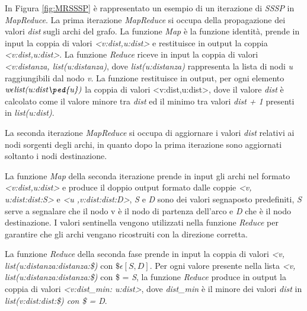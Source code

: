 \documentclass[LaM,binding=0.6cm]{sapthesis}
\begin{document}
In Figura \ref{fig:MRSSSP} è rappresentato un esempio di un iterazione di \textit{SSSP} in \textit{MapReduce}.
La prima iterazione \textit{MapReduce} si occupa della propagazione dei valori \textit{dist} sugli archi del grafo.
La funzione \textit{Map} è la funzione identità, prende in input la coppia di valori \textit{<v:dist,u:dist>} e restituisce in output la coppia \textit{<v:dist,u:dist>}.
La funzione \textit{Reduce} riceve in input la coppia di valori \textit{<v:distanza, list(u:distanza)}, dove \textit{list(u:distanza)} rappresenta la lista di nodi \textit{u} raggiungibili dal nodo \textit{v}. La funzione restituisce in output, per ogni elemento $\textit{w} \epsilon \textit{list(u:dist\ped{u})}$ la coppia di valori <v:dist,u:dist>, dove il valore \textit{dist} è calcolato come il valore minore tra  \textit{dist} ed il minimo tra valori \textit{dist + 1} presenti in \textit{list(u:dist)}. 

\begin{minipage}{\linewidth}
		
\end{minipage}

\begin{minipage}{\linewidth}
		
\end{minipage}

La seconda iterazione \textit{MapReduce} si occupa di aggiornare i valori \textit{dist} relativi ai  nodi sorgenti degli archi, in quanto dopo la prima iterazione sono aggiornati soltanto i nodi destinazione. 

La funzione \textit{Map} della seconda  iterazione prende in input gli archi nel formato \textit{<v:dist,u:dist>} e produce il doppio output formato dalle coppie \textit{<v, u:dist:dist:S>} e \textit{<u ,v:dist:dist:D>}, \textit{S} e \textit{D} sono dei valori segnaposto predefiniti, \textit{S} serve a segnalare che il nodo v è il nodo di partenza dell'arco e \textit{D} che è il nodo destinazione. I valori sentinella vengono utilizzati nella funzione \textit{Reduce} per garantire che gli archi vengano ricostruiti con la direzione corretta.

La funzione \textit{Reduce} della seconda fase prende in input la coppia di valori \textit{<v, list(u:distanza:distanza:\$)} con \textit{$\$ \epsilon [S,D]$}. 
Per ogni valore presente nella lista  \textit{<v, list(u:distanza:distanza:\$)} con \$ = \textit{S}, la funzione \textit{Reduce} produce in output la coppia di valori \textit{<v:dist\_min: u:dist>}, dove \textit{dist\_min} è il minore dei valori \textit{dist} in \textit{list(v:dist:dist:\$) con \$ = \textit{D}}.
\end{document}
